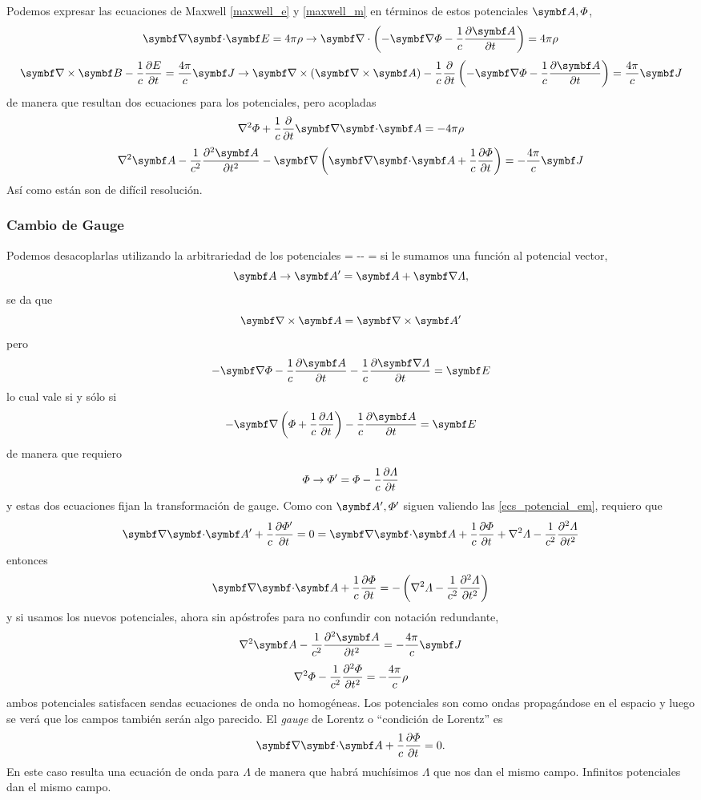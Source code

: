\documentclass[10pt,oneside]{CBFT_book}
\begin{document}
Podemos expresar las ecuaciones de Maxwell \eqref{maxwell_e} y \eqref{maxwell_m} en
términos de estos potenciales $\vb{A},\Phi$,
\[
	\divem{E} = 4\pi\rho \rightarrow 
	\Nabla\cdot\left( -\Nabla \Phi - \frac{1}{c}\dpar{\vb{A}}{t} \right) = 4\pi\rho
\]
\[
	\rotorm{B} - \frac{1}{c}\dpar{E}{t} =  \frac{4\pi}{c} \vb{J}  \rightarrow
	\Nabla\times(\rotorm{A}) - \frac{1}{c}\frac{\partial}{\partial t}\left( 
	-\Nabla \Phi - \frac{1}{c}\dpar{\vb{A}}{t} \right)=  \frac{4\pi}{c}\vb{J}
\]
de manera que resultan dos ecuaciones para los potenciales, pero acopladas
\[
	\nabla^2 \Phi + \frac{1}{c} \frac{\partial}{\partial t}\divem{A} = -4 \pi \rho
\]
\[
	\nabla^2 \vb{A} - \frac{1}{c^2} \dpar[2]{\vb{A}}{t} -\Nabla \left( \divem{A} + \frac{1}{c}
	\dpar{\Phi}{t} \right) = -\frac{4\pi}{c} \vb{J}
\]
Así como están son de difícil resolución.

\subsubsection{Cambio de Gauge}

Podemos desacoplarlas utilizando la arbitrariedad de los potenciales
\be
	 =  \qquad -\Nabla\Phi -   = 
	\label{ecs_potencial_em}
\ee
si le sumamos una función al potencial vector,
\[
	\vb{A} \rightarrow \vb{A}'= \vb{A} + \Nabla \Lambda,
\]
se da que 
\[
	\rotorm{A} = \rotorm{A'}
\]
pero
\[
	- \Nabla\Phi - \frac{1}{c}\dpar{\vb{A}}{t} - \frac{1}{c}\dpar{\Nabla\Lambda}{t} = \vb{E}
\]
lo cual vale si y sólo si
\[
	-\Nabla\left( \Phi + \frac{1}{c} \dpar{\Lambda}{t} \right) -\frac{1}{c}\dpar{\vb{A}}{t}   = \vb{E}
\]
de manera que requiero 
\[
	\Phi \rightarrow \Phi'= \Phi - \frac{1}{c} \dpar{\Lambda}{t}
\]
y estas dos ecuaciones fijan la transformación de gauge. Como con $\vb{A'}, \Phi'$ siguen valiendo las 
\eqref{ecs_potencial_em}, requiero que 
\[
	\divem{A'} + \frac{1}{c}\dpar{\Phi'}{t} = 0 = \divem{A} + \frac{1}{c}\dpar{\Phi}{t} + \nabla^2 \Lambda
	- \frac{1}{c^2} \dpar[2]{\Lambda}{t}
\]
entonces
\[
	\divem{A} + \frac{1}{c}\dpar{\Phi}{t} = -\left(\nabla^2 \Lambda - \frac{1}{c^2} \dpar[2]{\Lambda}{t}\right)
\]
y si usamos los nuevos potenciales, ahora sin apóstrofes para no confundir con notación redundante,
\[
	\nabla^2 \vb{A} - \frac{1}{c^2}\dpar[2]{\vb{A}}{t} = -\frac{4\pi}{c}\vb{J}
\]
\[
	\nabla^2 \Phi - \frac{1}{c^2}\dpar[2]{\Phi}{t} = -\frac{4\pi}{c}\rho
\]
ambos potenciales satisfacen sendas ecuaciones de onda no homogéneas. 
Los potenciales son como ondas propagándose en el espacio y luego se verá que los campos también
serán algo parecido.
El {\it gauge} de Lorentz o ``condición de Lorentz'' es
\[
	\divem{A} + \frac{1}{c} \dpar{\Phi}{t} = 0.
\]
En este caso resulta una ecuación de onda para $\Lambda$ de manera que habrá muchísimos $\Lambda$
que nos dan el mismo campo. Infinitos potenciales dan el mismo campo.
\end{document}

